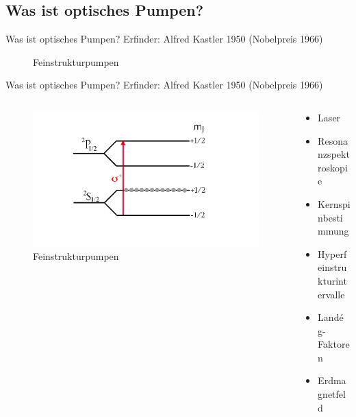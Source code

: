 \documentclass{beamer}
\begin{document}

\subsection{Was ist optisches Pumpen?}

\begin{frame}{Was ist optisches Pumpen?}
Erfinder: Alfred Kastler 1950 (Nobelpreis 1966)
	\begin{figure}[H]
	\caption{Feinstrukturpumpen}
	\end{figure}
\end{frame}


\begin{frame}{Was ist optisches Pumpen?}
Erfinder: Alfred Kastler 1950 (Nobelpreis 1966)
\begin{columns}
\begin{column}{5cm}
	\begin{figure}[H]
	\includegraphics[width = 1.3\textwidth]{Movies/animation2197.png}
	\caption{Feinstrukturpumpen}
	\end{figure}
\end{column}
\begin{column}{5cm}
	\begin{itemize}
	 \item Laser
	 \item Resonanzspektroskopie
	 \item Kernspinbestimmung
	 \item Hyperfeinstrukturintervalle
	 \item Landé g-Faktoren
	 \item Erdmagnetfeld
	\end{itemize}
\end{column}
\end{columns}
\end{frame}
\end{document}
